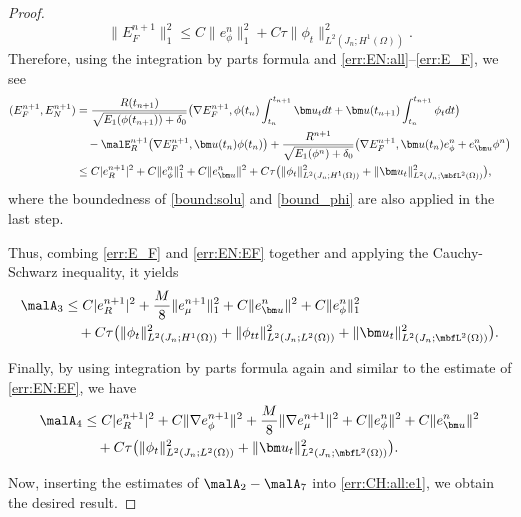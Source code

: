 \begin{proof}
\begin{equation}
		\|E_F^{n+1}\|_1^2 \le		C\|e_\phi^n\|_1^2  +C \tau \|\phi_t\|^2_{L^2(J_n ; H^1(\Omega))}.
	\end{equation}
	Therefore, using the integration by parts formula and \eqref{err:EN:all}--\eqref{err:E_F}, we see 
	\begin{equation} \label{err:EN:EF}
		\begin{aligned}
			 (E_F^{n+1}, E_N^{n+1}) 	& = \frac{R(t_{n+1})}{\sqrt{E_1(\phi(t_{n+1}))+\delta_0}}
			\big(\nabla E_F^{n+1},  \phi(t_n)\int_{t_n}^{t_{n+1}} \bm u_t dt+\bm u (t_{n+1}) \int_{t_n}^{t_{n+1}} \phi_t dt\big) \\
			& \quad - \malE_R^{n+1} \big(\nabla E_F^{n+1},  \bm u(t_{n}) \phi(t_{n})\big) 
			+\frac{R^{n+1}}{\sqrt{E_1(\phi^n)+\delta_0}}\big(\nabla E_F^{n+1}, \bm u(t_{n}) e_\phi^n +e_{\bm u}^n \phi^n\big)\\
			&  \leq C|e_R^{n+1}|^2 +C\|e_\phi^n\|_1^2+C\|e_{\bm u}^n\|^2
			+C\tau\big( \|\phi_t\|_{L^2(J_n ; H^1(\Omega))}^2 + \|\bm u_t\|_{L^2(J_n; \mbfL^2(\Omega))}^2 \big),
		\end{aligned}
	\end{equation}
	where the boundedness of \eqref{bound:solu}  and \eqref{bound_phi} are also applied in the last step.
	
	Thus, combing \eqref{err:E_F} and \eqref{err:EN:EF} together and applying the Cauchy-Schwarz inequality, it yields
	\begin{equation*} 
		\begin{aligned}
			\malA_{3} 
			&  \leq C|e_R^{n+1}|^2+\frac{M}{8}\|e_\mu^{n+1}\|_1^2
			+C\|e_{\bm u}^n\|^2+C\|e_\phi^n\|_1^2\\ %
			& \quad +C \tau \big(\|\phi_t\|_{L^2(J_n; H^1(\Omega))}^2
			+\|\phi_{tt}\|_{L^2(J_n; L^2(\Omega))}^2+\|\bm u_t\|_{L^2(J_n; \mbfL^2(\Omega))}^2\big).
		\end{aligned}
	\end{equation*}
	
	Finally, by using integration by parts formula again and similar to the estimate of \eqref{err:EN:EF}, we have
	\begin{equation*} 
		\begin{aligned}
			\malA_{4} 
			& \leq C|e_R^{n+1}|^2+C\|\nabla e_\phi^{n+1}\|^2+ \frac{M}{8}\|\nabla e_\mu^{n+1}\|^2 +C\|e_\phi^n\|^2+C\|e_{\bm u}^n\|^2\\
			& \quad +C \tau \big(\|\phi_t\|_{L^2(J_n ; L^2(\Omega))}^2+\|\bm u_t\|_{L^2(J_n ; \mbfL^2(\Omega))}^2\big).
		\end{aligned}
	\end{equation*}
	
Now, inserting the estimates of $\malA_2-\malA_{7}$ into \eqref{err:CH:all:e1}, we obtain the desired result.
\end{proof}

